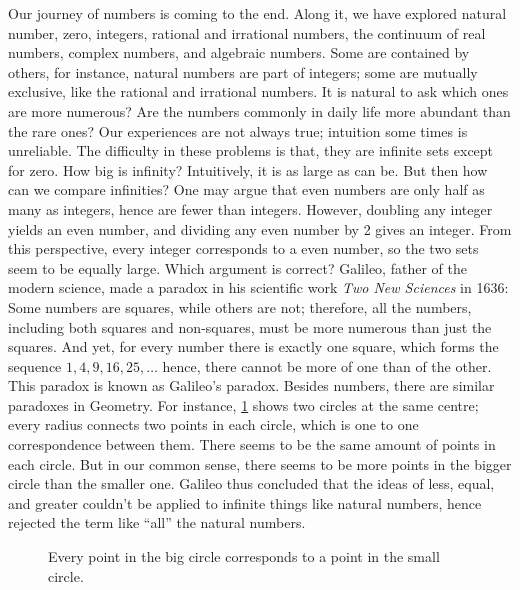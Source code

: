 \documentclass[b5paper]{article}
\begin{document}
Our journey of numbers is coming to the end. Along it, we have explored natural number, zero, integers, rational and irrational numbers, the continuum of real numbers, complex numbers, and algebraic numbers. Some are contained by others, for instance, natural numbers are part of integers; some are mutually exclusive, like the rational and irrational numbers. It is natural to ask which ones are more numerous? Are the numbers commonly in daily life more abundant than the rare ones? Our experiences are not always true; intuition some times is unreliable. The difficulty in these problems is that, they are infinite sets except for zero. How big is infinity? Intuitively, it is as large as can be. But then how can we compare infinities? One may argue that even numbers are only half as many as integers, hence are fewer than integers. However, doubling any integer yields an even number, and dividing any even number by 2 gives an integer. From this perspective, every integer corresponds to a even number, so the two sets seem to be equally large. Which argument is correct? Galileo, father of the modern science, made a paradox in his scientific work \emph{Two New Sciences} in 1636: Some numbers are squares, while others are not; therefore, all the numbers, including both squares and non-squares, must be more numerous than just the squares. And yet, for every number there is exactly one square, which forms the sequence $1, 4, 9, 16, 25, \dotsc$ hence, there cannot be more of one than of the other. This paradox is known as Galileo's paradox. Besides numbers, there are similar paradoxes in Geometry. For instance, \cref{fig:circles-paradox} shows two circles at the same centre; every radius connects two points in each circle, which is one to one correspondence between them. There seems to be the same amount of points in each circle. But in our common sense, there seems to be more points in the bigger circle than the smaller one. Galileo thus concluded that the ideas of less, equal, and greater couldn't be applied to infinite things like natural numbers, hence rejected the term like \enquote{all} the natural numbers.

\begin{figure}[htbp]
 \centering

 \caption{Every point in the big circle corresponds to a point in the small circle.}
 \label{fig:circles-paradox}
\end{figure}
\end{document}
